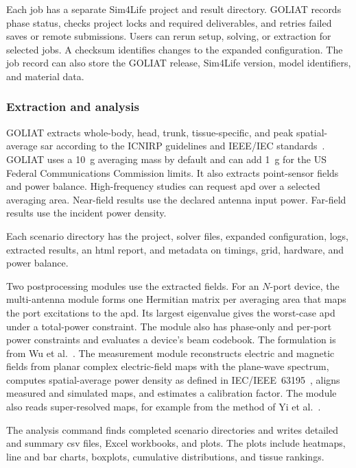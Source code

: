 \documentclass[final,5p,times,twocolumn]{elsarticle}
\begin{document}
Each job has a separate Sim4Life project and result directory. GOLIAT records phase status, checks project locks and required deliverables, and retries failed saves or remote submissions. Users can rerun setup, solving, or extraction for selected jobs. A checksum identifies changes to the expanded configuration. The job record can also store the GOLIAT release, Sim4Life version, model identifiers, and material data.

\subsubsection{Extraction and analysis}

GOLIAT extracts whole-body, head, trunk, tissue-specific, and peak spatial-average \gls{sar} according to the ICNIRP guidelines and IEEE/IEC standards~\cite{ICNIRP2020,IEC627041}. GOLIAT uses a 10~g averaging mass by default and can add 1~g for the US Federal Communications Commission limits. It also extracts point-sensor fields and power balance. High-frequency studies can request \gls{apd} over a selected averaging area. Near-field results use the declared antenna input power. Far-field results use the incident power density.

Each scenario directory has the project, solver files, expanded configuration, logs, extracted results, an \gls{html} report, and metadata on timings, grid, hardware, and power balance.

Two postprocessing modules use the extracted fields. For an $N$-port device, the multi-antenna module forms one Hermitian matrix per averaging area that maps the port excitations to the \gls{apd}. Its largest eigenvalue gives the worst-case \gls{apd} under a total-power constraint. The module also has phase-only and per-port power constraints and evaluates a device's beam codebook. The formulation is from Wu et al.~\cite{Wu2024}. The measurement module reconstructs electric and magnetic fields from planar complex electric-field maps with the plane-wave spectrum, computes spatial-average power density as defined in IEC/IEEE~63195~\cite{IEC631952}, aligns measured and simulated maps, and estimates a calibration factor. The module also reads super-resolved maps, for example from the method of Yi et al.~\cite{Yi2026}.

The analysis command finds completed scenario directories and writes detailed and summary \gls{csv} files, Excel workbooks, and plots. The plots include heatmaps, line and bar charts, boxplots, cumulative distributions, and tissue rankings.
\end{document}
